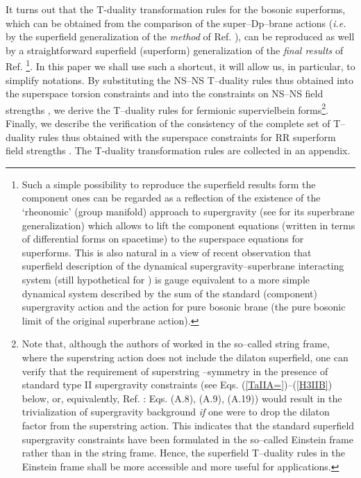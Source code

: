 \documentclass[a4paper,11pt]{article}
\begin{document}
It turns out that the 
T-duality transformation rules for the bosonic superforms, which 
can be obtained from the comparison of  
the super--Dp--brane actions ({\it i.e.} by the 
superfield generalization of the {\sl method} of Ref. \cite{simon}), 
can be reproduced as well by a straightforward 
superfield (superform) generalization of the 
{\sl final results} of 
Ref. \cite{simon}
\footnote{Such a simple possibility to reproduce the 
superfield results form the component ones can be regarded as a reflection 
of the existence of the `rheonomic' 
(group manifold) approach to supergravity \cite{rheo} (see \cite{bsv} for its 
superbrane generalization) which allows to lift the component equations 
(written 
in terms of differential forms on spacetime) to the superspace equations 
for superforms. This is also natural in a view of 
recent observation \cite{BdAIL2} that superfield description of the 
dynamical supergravity--superbrane interacting system (still hypothetical  
for \coordHE{}) is gauge equivalent to a more simple dynamical system 
described by the sum of the standard (component) supergravity action 
and the action for pure bosonic brane 
(the pure bosonic limit of the original superbrane action).}. 
In this paper we shall use such a shortcut, it will allow us, in particular, 
to simplify notations.
By substituting the NS--NS T--duality rules thus obtained 
into the superspace torsion constraints and into the constraints 
on NS--NS field strengths
\cite{HW84,CGO87,c0}, we derive the T--duality rules for fermionic 
supervielbein forms\footnote{Note that, although the authors 
of \cite{kulik} worked in the so--called string frame, 
where the superstring action does not include the dilaton superfield,  
one can verify 
that the requirement of superstring \myHighlight{$\kappa$}\coordHE{}--symmetry in the 
presence of standard type II supergravity constraints \cite{c0} 
(see Eqs. (\ref{TaIIA=})--(\ref{H3IIB}) below, or, equivalently, 
Ref. \cite{kulik}: Eqs. (A.8), (A.9), (A.19)) would result in the 
trivialization of supergravity background {\sl if} one were to drop the 
dilaton factor from the superstring action. 
This indicates that the standard superfield supergravity constraints 
have been formulated in the so--called 
Einstein frame rather than in the string frame.
Hence, the superfield T--duality rules in the Einstein frame shall be more  
accessible and more useful for applications.}. 
Finally, we describe the verification  
of the consistency of the complete set of 
T--duality rules thus obtained with the superspace constraints for RR 
superform field strengths \cite{c0}. The T-duality transformation rules are collected 
in an appendix.
\end{document}
